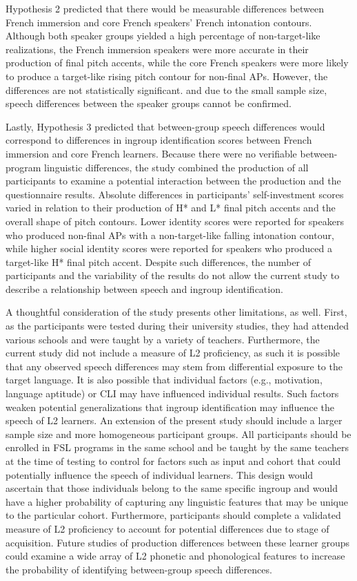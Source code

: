 \documentclass[output=paper,colorlinks,citecolor=brown,draftmode]{langscibook}
\begin{document}
Hypothesis 2 predicted that there would be measurable differences between French immersion and core French speakers’ French intonation contours. Although both speaker groups yielded a high percentage of non-target-like realizations, the French immersion speakers were more accurate in their production of final pitch accents, while the core French speakers were more likely to produce a target-like rising pitch contour for non-final APs. However, the differences are not statistically significant. and due to the small sample size, speech differences between the speaker groups cannot be confirmed.


Lastly, Hypothesis 3 predicted that between-group speech differences would correspond to differences in ingroup identification scores between French immersion and core French learners. Because there were no verifiable between-program linguistic differences, the study combined the production of all participants to examine a potential interaction between the production and the questionnaire results. Absolute differences in participants’ self-investment scores varied in relation to their production of H* and L* final pitch accents and the overall shape of pitch contours. Lower identity scores were reported for speakers who produced non-final APs with a non-target-like falling intonation contour, while higher social identity scores were reported for speakers who produced a target-like H* final pitch accent. Despite such differences, the number of participants and the variability of the results do not allow the current study to describe a relationship between speech and ingroup identification.


A thoughtful consideration of the study presents other limitations, as well. First, as the participants were tested during their university studies, they had attended various schools and were taught by a variety of teachers. Furthermore, the current study did not include a measure of L2 proficiency, as such it is possible that any observed speech differences may stem from differential exposure to the target language. It is also possible that individual factors (e.g., motivation, language aptitude) or CLI may have influenced individual results. Such factors weaken potential generalizations that ingroup identification may influence the speech of L2 learners. An extension of the present study should include a larger sample size and more homogeneous participant groups. All participants should be enrolled in FSL programs in the same school and be taught by the same teachers at the time of testing to control for factors such as input and cohort that could potentially influence the speech of individual learners. This design would ascertain that those individuals belong to the same specific ingroup and would have a higher probability of capturing any linguistic features that may be unique to the particular cohort. Furthermore, participants should complete a validated measure of L2 proficiency to account for potential differences due to stage of acquisition. Future studies of production differences between these learner groups could examine a wide array of L2 phonetic and phonological features to increase the probability of identifying between-group speech differences.
\end{document}
